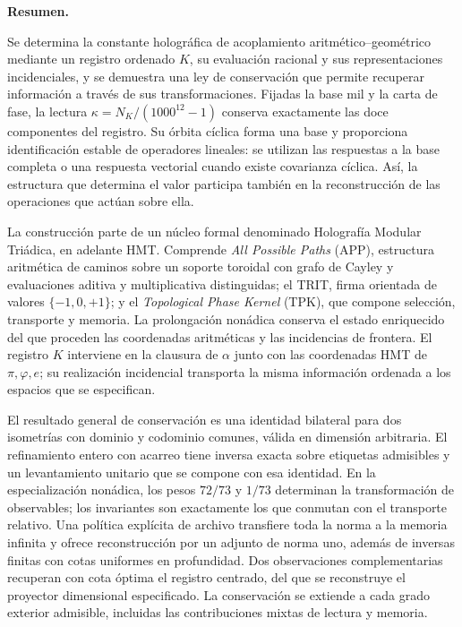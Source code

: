 \noindent\textbf{Resumen.}\par\smallskip
Se determina la constante holográfica de acoplamiento aritmético--geométrico mediante un registro ordenado \(K\), su evaluación racional y sus representaciones incidenciales, y se demuestra una ley de conservación que permite recuperar información a través de sus transformaciones. Fijadas la base mil y la carta de fase, la lectura \(\kappa=N_K/(1000^{12}-1)\) conserva exactamente las doce componentes del registro. Su órbita cíclica forma una base y proporciona identificación estable de operadores lineales: se utilizan las respuestas a la base completa o una respuesta vectorial cuando existe covarianza cíclica. Así, la estructura que determina el valor participa también en la reconstrucción de las operaciones que actúan sobre ella.

La construcción parte de un núcleo formal denominado Holografía Modular Triádica, en adelante HMT. Comprende \emph{All Possible Paths} (APP), estructura aritmética de caminos sobre un soporte toroidal con grafo de Cayley y evaluaciones aditiva y multiplicativa distinguidas; el TRIT, firma orientada de valores \(\{-1,0,+1\}\); y el \emph{Topological Phase Kernel} (TPK), que compone selección, transporte y memoria. La prolongación nonádica conserva el estado enriquecido del que proceden las coordenadas aritméticas y las incidencias de frontera. El registro \(K\) interviene en la clausura de \(\alpha\) junto con las coordenadas HMT de \(\pi,\varphi,e\); su realización incidencial transporta la misma información ordenada a los espacios que se especifican.

El resultado general de conservación es una identidad bilateral para dos isometrías con dominio y codominio comunes, válida en dimensión arbitraria. El refinamiento entero con acarreo tiene inversa exacta sobre etiquetas admisibles y un levantamiento unitario que se compone con esa identidad. En la especialización nonádica, los pesos \(72/73\) y \(1/73\) determinan la transformación de observables; los invariantes son exactamente los que conmutan con el transporte relativo. Una política explícita de archivo transfiere toda la norma a la memoria infinita y ofrece reconstrucción por un adjunto de norma uno, además de inversas finitas con cotas uniformes en profundidad. Dos observaciones complementarias recuperan con cota óptima el registro centrado, del que se reconstruye el proyector dimensional especificado. La conservación se extiende a cada grado exterior admisible, incluidas las contribuciones mixtas de lectura y memoria.

